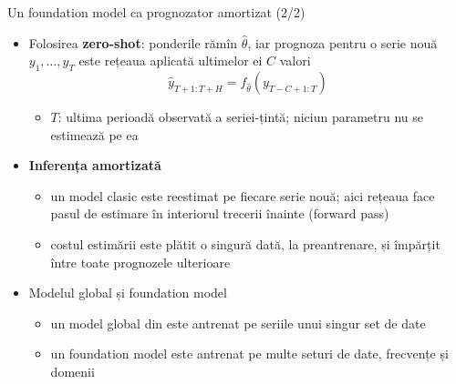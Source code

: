 \begin{frame}{Un foundation model ca prognozator amortizat (2/2)}
\itemsize{\small}
\begin{itemize}
    \item Folosirea \textbf{zero-shot}: ponderile rămîn $\hat\theta$, iar prognoza pentru o serie nouă $y_1, \dots, y_T$ este rețeaua aplicată ultimelor ei $C$ valori \[ \hat y_{T+1:T+H} = f_{\hat\theta}(y_{T-C+1:T}) \]
    \begin{itemize}
        \item $T$: ultima perioadă observată a seriei-țintă; niciun parametru nu se estimează pe ea
    \end{itemize}
    \item \textbf{Inferența amortizată}
    \begin{itemize}
        \item un model clasic este reestimat pe fiecare serie nouă; aici rețeaua face pasul de estimare în interiorul trecerii înainte (forward pass)
        \item costul estimării este plătit o singură dată, la preantrenare, și împărțit între toate prognozele ulterioare
    \end{itemize}
    \item Modelul global și foundation model
    \begin{itemize}
        \item un model global din  este antrenat pe seriile unui singur set de date
        \item un foundation model este antrenat pe multe seturi de date, frecvențe și domenii
    \end{itemize}
\end{itemize}
\end{frame}

